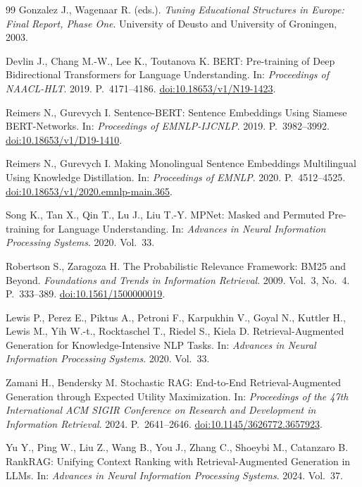 \documentclass[twoside,11pt]{article}
\begin{document}
\begin{thebibliography}{99}
Gonzalez J., Wagenaar R. (eds.).
\textit{Tuning Educational Structures in Europe: Final Report, Phase One}.
University of Deusto and University of Groningen, 2003.

Devlin J., Chang M.-W., Lee K., Toutanova K.
BERT: Pre-training of Deep Bidirectional Transformers for Language Understanding.
In: \textit{Proceedings of NAACL-HLT}. 2019. P.~4171--4186.
\href{https://doi.org/10.18653/v1/N19-1423}{doi:10.18653/v1/N19-1423}.

Reimers N., Gurevych I.
Sentence-BERT: Sentence Embeddings Using Siamese BERT-Networks.
In: \textit{Proceedings of EMNLP-IJCNLP}. 2019. P.~3982--3992.
\href{https://doi.org/10.18653/v1/D19-1410}{doi:10.18653/v1/D19-1410}.

Reimers N., Gurevych I.
Making Monolingual Sentence Embeddings Multilingual Using Knowledge Distillation.
In: \textit{Proceedings of EMNLP}. 2020. P.~4512--4525.
\href{https://doi.org/10.18653/v1/2020.emnlp-main.365}{doi:10.18653/v1/2020.emnlp-main.365}.

Song K., Tan X., Qin T., Lu J., Liu T.-Y.
MPNet: Masked and Permuted Pre-training for Language Understanding.
In: \textit{Advances in Neural Information Processing Systems}. 2020. Vol.~33.

Robertson S., Zaragoza H.
The Probabilistic Relevance Framework: BM25 and Beyond.
\textit{Foundations and Trends in Information Retrieval}. 2009. Vol.~3, No.~4. P.~333--389.
\href{https://doi.org/10.1561/1500000019}{doi:10.1561/1500000019}.

Lewis P., Perez E., Piktus A., Petroni F., Karpukhin V., Goyal N., Kuttler H., Lewis M., Yih W.-t., Rocktaschel T., Riedel S., Kiela D.
Retrieval-Augmented Generation for Knowledge-Intensive NLP Tasks.
In: \textit{Advances in Neural Information Processing Systems}. 2020. Vol.~33.

Zamani H., Bendersky M.
Stochastic RAG: End-to-End Retrieval-Augmented Generation through Expected Utility Maximization.
In: \textit{Proceedings of the 47th International ACM SIGIR Conference on Research and Development in Information Retrieval}. 2024. P.~2641--2646.
\href{https://doi.org/10.1145/3626772.3657923}{doi:10.1145/3626772.3657923}.

Yu Y., Ping W., Liu Z., Wang B., You J., Zhang C., Shoeybi M., Catanzaro B.
RankRAG: Unifying Context Ranking with Retrieval-Augmented Generation in LLMs.
In: \textit{Advances in Neural Information Processing Systems}. 2024. Vol.~37.


\end{thebibliography}
\end{document}

